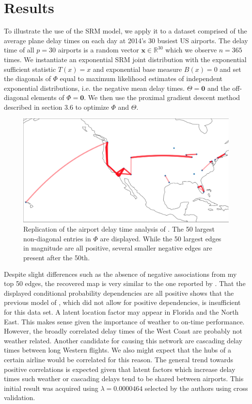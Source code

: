 \documentclass{samkoelleprelimworking}
\begin{document}
 \section{Results} 
 
 To illustrate the use of the SRM model, we apply it to a dataset comprised of the average plane delay times on each day at 2014's 30 busiest US airports.  The delay time of all $p = 30$ airports is a random vector $\bm{x} \in \mathbb{R}^{30}$ which we observe $n=365$ times.  We instantiate an exponential SRM joint distribution with the exponential sufficient statistic $T(x) = x$ and exponential base measure $B(x) = 0$ and set the diagonals of $\Phi$ equal to maximum likelihood estimates of independent exponential distributions, i.e. the negative mean delay times.  $\Theta = \bm{0}$ and the off-diagonal elements of $\Phi = \bm{0}$.  We then use the proximal gradient descent method described in section 3.6 to optimize $\Phi$ and $\Theta$.  
 
 \begin{figure}\label{fig:map}
\includegraphics[width=\textwidth]{map}
\caption{Replication of the airport delay time analysis of \citep{Inouye}.  The 50 largest non-diagonal entries in $\Phi$ are displayed. While the 50 largest edges in magnitude are all positive, several smaller negative edges are present after the 50th. }
\end{figure}

Despite slight differences such as the absence of negative associations from my top 50 edges, the recovered map is very similar to the one reported by \citep{Inouye2016-hl}.  That the displayed conditional probability dependencies are all positive shows that the previous model of \citep{Yang}, which did not allow for positive dependencies, is insufficient for this data set.  A latent location factor may appear in Florida and the North East.  This makes sense given the importance of weather to on-time performance.  However, the broadly correlated delay times of the West Coast are probably not weather related.  Another candidate for causing this network are cascading delay times between long Western flights. We also might expect that the hubs of a certain airline would be correlated for this reason.  The general trend towards positive correlations is expected given that latent factors which increase delay times such weather or cascading delays tend to be shared between airports. This initial result was acquired using $\lambda = 0.0000464$ selected by the authors using cross validation.
\end{document}
